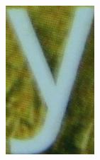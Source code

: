 \documentclass[a4paper]{article}
\begin{document}
\begin{enumerate}
\begin{enumerate}
\begin{figure}[H]
            \hfill
            \begin{subfigure}[b]{.17\linewidth}
	            \includegraphics[width=\linewidth]{HW1-release/data/character_classification/new_images/5_Y.jpg}
	        \end{subfigure}
	        \hfill
	        \begin{subfigure}[b]{.22\linewidth}

\end{subfigure}
\end{figure}
\end{enumerate}
\end{enumerate}
\end{document}
